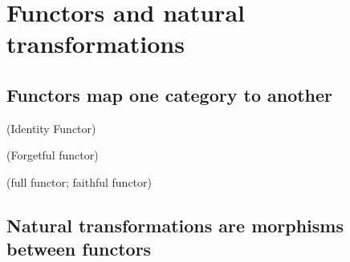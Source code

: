 
\section{Functors and natural transformations}

\subsection{Functors map one category to another}

\begin{example}{(Identity Functor)}
\end{example}
\begin{example}{(Forgetful functor)}
\end{example}

\begin{definition}{(full functor; faithful functor)}

\end{definition}

\subsection{Natural transformations are morphisms between functors}